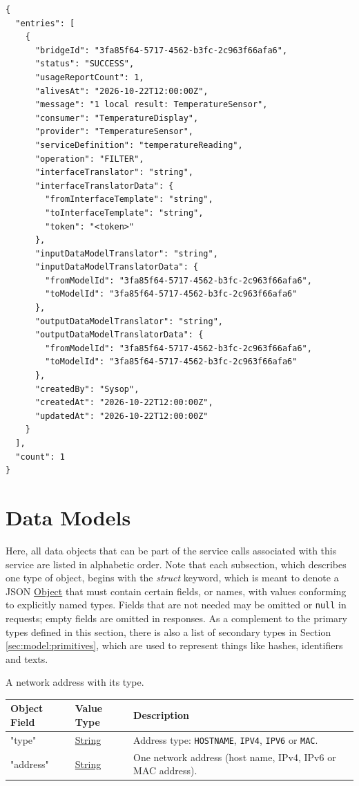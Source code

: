\documentclass[a4paper]{arrowhead}
\newcommand{\oref}[1]{{\textcolor{ArrowheadBlue}{\hyperref[sec:operations:#1]{#1}}}}
\newcommand{\pref}[1]{{\textcolor{ArrowheadGrey}{\hyperref[sec:model:primitives:#1]{#1}}}}
\begin{document}
\begin{lstlisting}[label={lst:query-resp},caption={An \oref{query} response.}]
{
  "entries": [
    {
      "bridgeId": "3fa85f64-5717-4562-b3fc-2c963f66afa6",
      "status": "SUCCESS",
      "usageReportCount": 1,
      "alivesAt": "2026-10-22T12:00:00Z",
      "message": "1 local result: TemperatureSensor",
      "consumer": "TemperatureDisplay",
      "provider": "TemperatureSensor",
      "serviceDefinition": "temperatureReading",
      "operation": "FILTER",
      "interfaceTranslator": "string",
      "interfaceTranslatorData": {
        "fromInterfaceTemplate": "string",
        "toInterfaceTemplate": "string",
        "token": "<token>"
      },
      "inputDataModelTranslator": "string",
      "inputDataModelTranslatorData": {
        "fromModelId": "3fa85f64-5717-4562-b3fc-2c963f66afa6",
        "toModelId": "3fa85f64-5717-4562-b3fc-2c963f66afa6"
      },
      "outputDataModelTranslator": "string",
      "outputDataModelTranslatorData": {
        "fromModelId": "3fa85f64-5717-4562-b3fc-2c963f66afa6",
        "toModelId": "3fa85f64-5717-4562-b3fc-2c963f66afa6"
      },
      "createdBy": "Sysop",
      "createdAt": "2026-10-22T12:00:00Z",
      "updatedAt": "2026-10-22T12:00:00Z"
    }
  ],
  "count": 1
}
\end{lstlisting}

\newpage

\section{Data Models}
\label{sec:model}

Here, all data objects that can be part of the service calls associated with this service are listed in alphabetic order.
Note that each subsection, which describes one type of object, begins with the \textit{struct} keyword, which is meant to denote a JSON \pref{Object} that must contain certain fields, or names, with values conforming to explicitly named types.
Fields that are not needed may be omitted or \texttt{null} in requests; empty fields are omitted in responses.
As a complement to the primary types defined in this section, there is also a list of secondary types in Section \ref{sec:model:primitives}, which are used to represent things like hashes, identifiers and texts.


A network address with its type.


\noindent\begin{tabularx}{\textwidth}{| >{\raggedright\arraybackslash}p{3.9cm} | >{\raggedright\arraybackslash\small}p{5.3cm} | X |} \hline
\rowcolor{gray!33} Object Field & Value Type & Description \\ \hline
"type" & \pref{String} & Address type: \texttt{HOSTNAME}, \texttt{IPV4}, \texttt{IPV6} or \texttt{MAC}. \\ \hline
"address" & \pref{String} & One network address (host name, IPv4, IPv6 or MAC address). \\ \hline
\end{tabularx}
\end{document}
